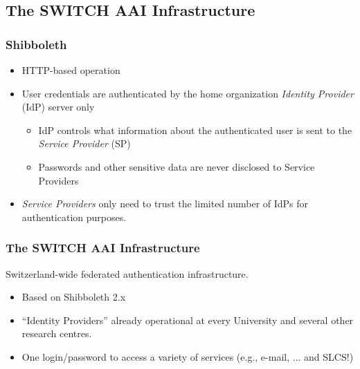 \documentclass{beamer}
\newcommand{\+}{\vspace{1em}}
\begin{document}
\subsection[AAI Infrastructure]{The SWITCH AAI Infrastructure}

\begin{frame}[label=shib]
  \frametitle{Shibboleth}
    \begin{itemize}
    \item HTTP-based operation
    \item User credentials are authenticated by the
      home organization \emph{Identity Provider} (IdP) server only
      \begin{itemize}
      \item IdP controls what information about the authenticated user
        is sent to the \emph{Service Provider} (SP)
      \item Passwords and other sensitive data are never disclosed to
        Service Providers
      \end{itemize}
    \item \emph{Service Providers} only need to trust the limited number
      of IdPs for authentication purposes.
    \end{itemize}
    
    \+
    \hyperlink{more-shib}{}
\end{frame}


\begin{frame}
  \frametitle{The SWITCH AAI Infrastructure}
  {\Large Switzerland-wide federated authentication infrastructure.}
  \begin{itemize}
  \item Based on Shibboleth 2.x
  \item ``Identity Providers'' already operational at every University
    and several other research centres.
  \item One login/password to access a variety of services
    (e.g., e-mail, ... and SLCS!)
  \end{itemize}
\end{frame}
\end{document}
